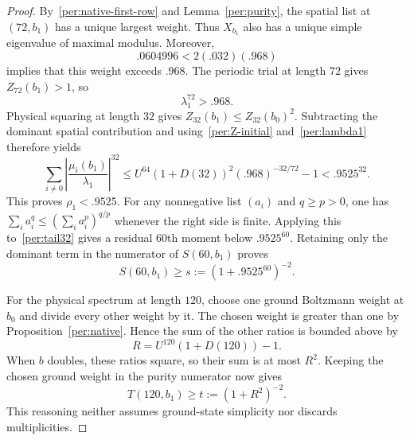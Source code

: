 \documentclass[11pt]{article}
\theoremstyle{remark}
\numberwithin{equation}{section}
\begin{document}
\begin{proof}
By~\eqref{per:native-first-row} and Lemma~\ref{per:purity}, the spatial
list at $(72,b_1)$ has a unique largest weight.  Thus $X_{b_1}$ also
has a unique simple eigenvalue of maximal modulus.  Moreover,
\[
 .0604996<2(.032)(.968)
\]
implies that this weight exceeds $.968$.  The periodic trial at length
$72$ gives $Z_{72}(b_1)>1$, so
\begin{equation}\label{per:lambda1}
 \lambda_1^{72}>.968.
\end{equation}
Physical squaring at length $32$ gives
$Z_{32}(b_1)\le Z_{32}(b_0)^2$.  Subtracting the dominant spatial
contribution and using~\eqref{per:Z-initial} and~\eqref{per:lambda1}
therefore yields
\begin{equation}\label{per:tail32}
 \sum_{i\ne0}\left|\frac{\mu_i(b_1)}{\lambda_1}\right|^{32}
 \le U^{64}(1+D(32))^2(.968)^{-32/72}-1
 <.9525^{32}.
\end{equation}
This proves $\rho_1<.9525$.  For any nonnegative list $(a_i)$ and
$q\ge p>0$, one has
$\sum_i a_i^q\le(\sum_i a_i^p)^{q/p}$ whenever the right side is finite.
Applying this to~\eqref{per:tail32} gives a residual $60$th moment below
$.9525^{60}$.  Retaining only the dominant term in the numerator of
$S(60,b_1)$ proves
\begin{equation}\label{per:seed-s}
 S(60,b_1)\ge s:=(1+.9525^{60})^{-2}.
\end{equation}

For the physical spectrum at length $120$, choose one ground
Boltzmann weight at $b_0$ and divide every other weight by it.
The chosen weight is greater than one by Proposition~\ref{per:native}.
Hence the sum of the other ratios is bounded above by
\[
 R=U^{120}(1+D(120))-1.
\]
When $b$ doubles, these ratios square, so their sum is at most $R^2$.
Keeping the chosen ground weight in the purity numerator now gives
\begin{equation}\label{per:seed-t}
 T(120,b_1)\ge t:=(1+R^2)^{-2}.
\end{equation}
This reasoning neither assumes ground-state simplicity nor discards
multiplicities.


\end{proof}
\end{document}
